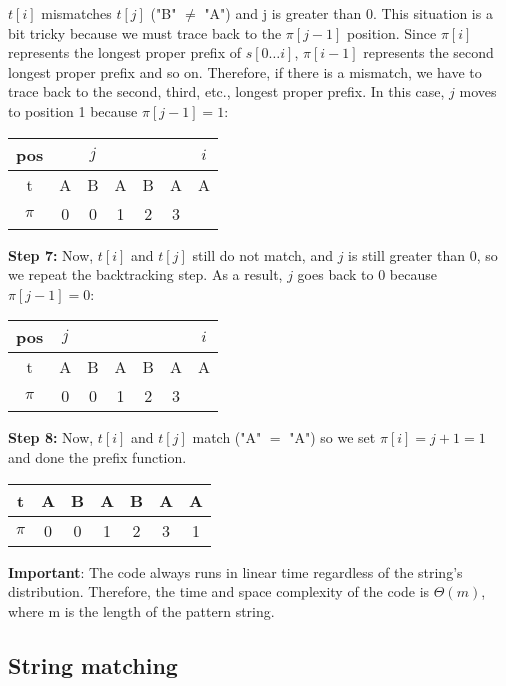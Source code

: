     $t[i]$ mismatches $t[j]$ ("B" $\neq$ "A") and j is greater than 0. This situation is a bit tricky because we must trace back to the $\pi[j - 1]$ position. Since $\pi[i]$ represents the longest proper prefix of $s[0\dots i]$, $\pi[i - 1]$ represents the second longest proper prefix and so on. Therefore, if there is a mismatch, we have to trace back to the second, third, etc., longest proper prefix. In this case, $j$ moves to position 1 because $\pi[j - 1] = 1$:
    \begin{table}[H]
    \centering
    \begin{tabular}{|c|c|c|c|c|c|c|}
    \hline
    pos   &   & $j$ &   &   &   & $i$ \\ \hline
    t     & A & B & A & B & A & A \\ \hline
    $\pi$ & 0 & 0 & 1 & 2 & 3 &   \\ \hline
    \end{tabular}
    \end{table}
    \textbf{Step 7: }Now, $t[i]$ and $t[j]$ still do not match, and $j$ is still greater than 0, so we repeat the backtracking step. As a result, $j$ goes back to $0$ because $\pi[j - 1] = 0$:
    \begin{table}[H]
    \centering
    \begin{tabular}{|c|c|c|c|c|c|c|}
    \hline
    pos   & $j$ &   &   &   &   & $i$ \\ \hline
    t     & A & B & A & B & A & A \\ \hline
    $\pi$ & 0 & 0 & 1 & 2 & 3 &   \\ \hline
    \end{tabular}
    \end{table}
    \textbf{Step 8: }Now, $t[i]$ and $t[j]$ match ("A" $=$ "A") so we set $\pi[i] = j + 1 = 1$ and done the prefix function.
    \begin{table}[H]
    \centering
    \begin{tabular}{|c|c|c|c|c|c|c|}
    \hline
    t     & A & B & A & B & A & A \\ \hline
    $\pi$ & 0 & 0 & 1 & 2 & 3 & 1 \\ \hline
    \end{tabular}
    \end{table}

    \textbf{Important}: The code always runs in linear time regardless of the string's distribution. Therefore, the time and space complexity of the code is $\Theta(m)$, where m is the length of the pattern string.
\subsection{String matching}

